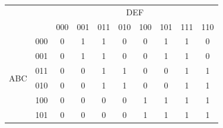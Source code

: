 \documentclass{report}
\begin{document}
                \begin{table}[h]
                    \centering
                    \begin{tabular}{|c|l|c|c|c|c|c|c|c|c|}
                    \hline
                    \multicolumn{2}{|l|}{\multirow{2}{*}{}} & \multicolumn{8}{c|}{DEF}                                                                                                                                                                                              \\ \cline{3-10} 
                    \multicolumn{2}{|l|}{}                  & \multicolumn{1}{l|}{000} & \multicolumn{1}{l|}{001} & \multicolumn{1}{l|}{011} & \multicolumn{1}{l|}{010} & \multicolumn{1}{l|}{100} & \multicolumn{1}{l|}{101} & \multicolumn{1}{l|}{111} & \multicolumn{1}{l|}{110} \\ \hline
                    \multirow{8}{*}{ABC}        & 000       & 0                        & 1                        & 1                        & 0                        & 0                        & 1                        & 1                        & 0                        \\ \cline{2-10} 
                                                & 001       & 0                        & 1                        & 1                        & 0                        & 0                        & 1                        & 1                        & 0                        \\ \cline{2-10} 
                                                & 011       & 0                        & 0                        & 1                        & 1                        & 0                        & 0                        & 1                        & 1                        \\ \cline{2-10} 
                                                & 010       & 0                        & 0                        & 1                        & 1                        & 0                        & 0                        & 1                        & 1                        \\ \cline{2-10} 
                                                & 100       & 0                        & 0                        & 0                        & 0                        & 1                        & 1                        & 1                        & 1                        \\ \cline{2-10} 
                                                & 101       & 0                        & 0                        & 0                        & 0                        & 1                        & 1                        & 1                        & 1                        \\ \cline{2-10} 

\end{tabular}
\end{table}
\end{document}
